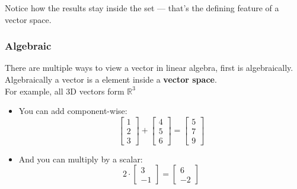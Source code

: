 \documentclass[12pt]{article}
\begin{document}
            Notice how the results stay inside the set — that’s the defining feature of a vector space.
            
        \subsubsection{Algebraic}
            There are multiple ways to view a vector in linear algebra, first is algebraically. Algebraically a vector is a element inside a \textbf{vector space}. \\
            For example, all 3D vectors form $\mathbb{R}^3$

            \begin{itemize}
                \item  You can add component-wise: \\
                \begin{equation}
                  \begin{bmatrix}1 \\ 2 \\ 3 \end{bmatrix} + \begin{bmatrix}4 \\ 5 \\ 6 \end{bmatrix} = \begin{bmatrix}5 \\ 7 \\ 9 \end{bmatrix}
                \end{equation}

                \item  And you can multiply by a scalar: \\
                \begin{equation}
                   2 \cdot \begin{bmatrix}3 \\ -1 \end{bmatrix} = \begin{bmatrix}6 \\ -2 \end{bmatrix}
                \end{equation}
            \end{itemize}
            
\end{document}
